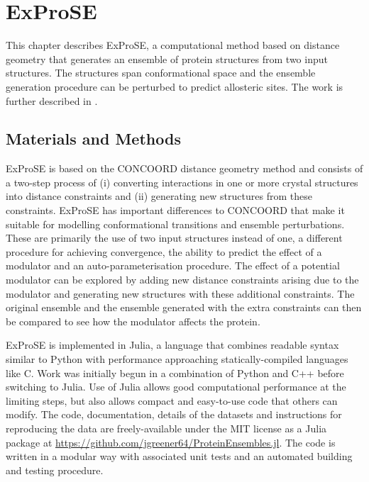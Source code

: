 \chapter{ExProSE}
\label{cha:exprose}

This chapter describes ExProSE, a computational method based on distance geometry that generates an ensemble of protein structures from two input structures.
The structures span conformational space and the ensemble generation procedure can be perturbed to predict allosteric sites.
The work is further described in \cite{Greener2017}.


\section{Materials and Methods}
\label{sec:exprose_methods}

ExProSE is based on the CONCOORD distance geometry method \cite{DeGroot1997} and consists of a two-step process of (i) converting interactions in one or more crystal structures into distance constraints and (ii) generating new structures from these constraints.
ExProSE has important differences to CONCOORD that make it suitable for modelling conformational transitions and ensemble perturbations.
These are primarily the use of two input structures instead of one, a different procedure for achieving convergence, the ability to predict the effect of a modulator and an auto-parameterisation procedure.
The effect of a potential modulator can be explored by adding new distance constraints arising due to the modulator and generating new structures with these additional constraints. The original ensemble and the ensemble generated with the extra constraints can then be compared to see how the modulator affects the protein.

ExProSE is implemented in Julia, a language that combines readable syntax similar to Python with performance approaching statically-compiled languages like C.
Work was initially begun in a combination of Python and C++ before switching to Julia.
Use of Julia allows good computational performance at the limiting steps, but also allows compact and easy-to-use code that others can modify.
The code, documentation, details of the datasets and instructions for reproducing the data are freely-available under the MIT license as a Julia package at \url{https://github.com/jgreener64/ProteinEnsembles.jl}.
The code is written in a modular way with associated unit tests and an automated building and testing procedure.


